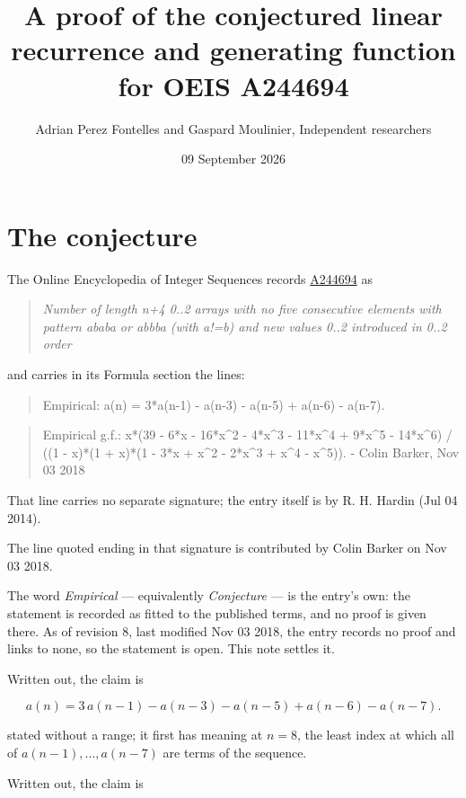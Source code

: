 \documentclass[11pt]{article}
\title{A proof of the conjectured linear recurrence and generating function for OEIS A244694}
\author{Adrian Perez Fontelles and Gaspard Moulinier, Independent researchers}
\date{09 September 2026}
\theoremstyle{definition}
\begin{document}
\maketitle
\section{The conjecture}

The Online Encyclopedia of Integer Sequences records \href{https://oeis.org/A244694}{A244694} as

\begin{quote}\itshape Number of length n+4 0..2 arrays with no five consecutive elements with pattern ababa or abbba (with a!=b) and new values 0..2 introduced in 0..2 order\end{quote}

and carries in its Formula section the lines:

\begin{quote}\ttfamily Empirical: a(n) = 3*a(n-1) - a(n-3) - a(n-5) + a(n-6) - a(n-7).\end{quote}

\begin{quote}\ttfamily Empirical g.f.: x*(39 - 6*x - 16*x\textasciicircum{}2 - 4*x\textasciicircum{}3 - 11*x\textasciicircum{}4 + 9*x\textasciicircum{}5 - 14*x\textasciicircum{}6) / ((1 - x)*(1 + x)*(1 - 3*x + x\textasciicircum{}2 - 2*x\textasciicircum{}3 + x\textasciicircum{}4 - x\textasciicircum{}5)). - Colin Barker, Nov 03 2018\end{quote}

That line carries no separate signature; the entry itself is by R. H. Hardin (Jul 04 2014).

The line quoted ending in that signature is contributed by Colin Barker on Nov 03 2018.

The word {\itshape Empirical} --- equivalently {\itshape Conjecture} --- is the entry's own: the statement is recorded as fitted to the published terms, and no proof is given there. As of revision 8, last modified Nov 03 2018, the entry records no proof and links to none, so the statement is open. This note settles it.

Written out, the claim is

\[a(n) = 3\,a(n-1) - a(n-3) - a(n-5) + a(n-6) - a(n-7).\]

stated without a range; it first has meaning at $n = 8$, the least index at which all of $a(n-1),\dots,a(n-7)$ are terms of the sequence.

Written out, the claim is
\end{document}
